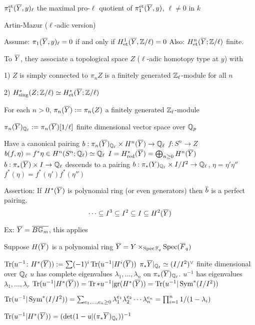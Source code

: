 $\pi_1^\text{et}(\overline{Y},y)_\ell$ the maximal pro-$\ell$ quotient of $\pi_1^\text{et}(\overline{Y},y)$, $\ell \neq 0$ in $k$


Artin-Mazur ($\ell$-adic version)

Assume: $\pi_1(\overline{Y},y)_\ell= 0$ if and only if $H^1_\text{et}(\overline{Y},\mathbb{Z}/\ell)=0$
Also: $H^n_\text{et}(\overline{Y};\mathbb{Z}/\ell)$ finite.

To $\overline{Y}$, they associate a topological space $Z$ ($\ell$-adic homotopy type at $y$) with 

1) $Z$ is simply connected to $\pi_n Z$ is a finitely generated $\mathbb{Z}_\ell$-module for all $n$

2) $H^*_\text{sing}(Z;\mathbb{Z}/\ell) \simeq H^*_\text{et}(\overline{Y}; \mathbb{Z}/\ell)$

For each $n>0$, $\pi_n(\overline{Y}):= \pi_n(Z)$ a finitely generated $\mathbb{Z}_\ell$-module 

$\pi_n(\overline{Y})_{\mathbb{Q}_\ell}:= \pi_n(\overline{Y})[1/\ell]$ finite dimensional vector space over $\mathbb{Q}_p$

Have a canonical pairing $b: \pi_n(\overline{Y})_{\mathbb{Q}_\ell} \times H^n(\overline{Y}) \to \mathbb{Q}_\ell$
$f: S^n \to Z$
$b(f,\eta)= f^*\eta \in H^n(S^n; \mathbb{Q}_\ell) \simeq \mathbb{Q}_\ell$
$I= H^*_\text{red}(\overline{Y})= \bigoplus_{n \geq 0} H^n(\overline{Y})$
$b: \pi_*(\overline{Y}) \times I \to \mathbb{Q}_\ell$
descends to a pairing $b: \pi_*(Y)_{\mathbb{Q}_\ell} \times I/I^2 \to \mathbb{Q}_\ell$, 
$\eta= \eta' \eta''$
$f^*(\eta)= f^*(\eta')f^*(\eta'')$



Assertion: If $H^*(\overline{Y})$ is polynomial ring (or even generators) then $\overline{b}$ is a perfect pairing. 
	\[
	\cdots \subseteq I^3 \subseteq I^2 \subseteq I \subseteq H^2(\overline{Y})
	\]

Ex: $\overline{Y}= \overline{B\mathbb{G}_m}$, this applies


Suppose $H(\overline{Y})$ is a polynomial ring
$\overline{Y}= Y \times_{\operatorname{Spec} \mathbb{F}_q} \operatorname{Spec}(\overline{F}_q)$

$\operatorname{Tr}(u^{-1} \colon H^*(\overline{Y})):= \sum (-1)^i \operatorname{Tr}(u^{-1} | H^i(\overline{Y}))$
$\pi_* \overline{Y}|_{\mathbb{Q}_\ell} \simeq (I/I^2)^\vee$ finite dimensional over $\mathbb{Q}_\ell$
$u$ has complete eigenvalues
$\lambda_1,\ldots,\lambda_n$ on $\pi_*(\overline{Y})_{\mathbb{Q}_\ell}$.
$u^{-1}$ has eigenvalues
$\lambda_1,\ldots,\lambda_r$
$\operatorname{Tr}(u^{-1} | H^*(\overline{Y}))= \operatorname{Tr}*u^{-1} | \text{gr}(H^*(\overline{Y}))= \operatorname{Tr}(u^{-1} | \operatorname{Sym}^*(I/I^2))$

$\operatorname{Tr}(u^{-1}|\operatorname{Sym}^*(I/I^2))= \sum_{e_1,\ldots,e_n \geq 0} \lambda_1^{e_1} \lambda_2^{e_2} \cdots \lambda_n^{e_n}= \prod_{i=1}^n 1/(1-\lambda_i)$

$\operatorname{Tr}(u^{-1}| H^*(\overline{Y}))= (\det(1-u | (\pi_* \overline{Y})_{\mathbb{Q}_\ell}))^{-1}$

